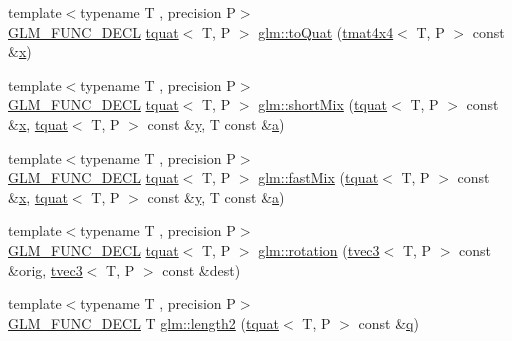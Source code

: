 \begin{DoxyCompactItemize}
\item 
{\footnotesize template$<$typename T , precision P$>$ }\\\mbox{\hyperlink{setup_8hpp_ab2d052de21a70539923e9bcbf6e83a51}{G\+L\+M\+\_\+\+F\+U\+N\+C\+\_\+\+D\+E\+CL}} \mbox{\hyperlink{structglm_1_1tquat}{tquat}}$<$ T, P $>$ \mbox{\hyperlink{group__gtx__quaternion_ga808dd0f83ee8150db7e652313bde8eb2}{glm\+::to\+Quat}} (\mbox{\hyperlink{structglm_1_1tmat4x4}{tmat4x4}}$<$ T, P $>$ const \&\mbox{\hyperlink{glad_8h_a92d0386e5c19fb81ea88c9f99644ab1d}{x}})
\item 
{\footnotesize template$<$typename T , precision P$>$ }\\\mbox{\hyperlink{setup_8hpp_ab2d052de21a70539923e9bcbf6e83a51}{G\+L\+M\+\_\+\+F\+U\+N\+C\+\_\+\+D\+E\+CL}} \mbox{\hyperlink{structglm_1_1tquat}{tquat}}$<$ T, P $>$ \mbox{\hyperlink{group__gtx__quaternion_ga3534443de2a1a806f386976546cddc81}{glm\+::short\+Mix}} (\mbox{\hyperlink{structglm_1_1tquat}{tquat}}$<$ T, P $>$ const \&\mbox{\hyperlink{glad_8h_a92d0386e5c19fb81ea88c9f99644ab1d}{x}}, \mbox{\hyperlink{structglm_1_1tquat}{tquat}}$<$ T, P $>$ const \&\mbox{\hyperlink{glad_8h_a66ddd433d2cacfe27f5906b7e86faeed}{y}}, T const \&\mbox{\hyperlink{glad_8h_ac8729153468b5dcf13f971b21d84d4e5}{a}})
\item 
{\footnotesize template$<$typename T , precision P$>$ }\\\mbox{\hyperlink{setup_8hpp_ab2d052de21a70539923e9bcbf6e83a51}{G\+L\+M\+\_\+\+F\+U\+N\+C\+\_\+\+D\+E\+CL}} \mbox{\hyperlink{structglm_1_1tquat}{tquat}}$<$ T, P $>$ \mbox{\hyperlink{group__gtx__quaternion_gac11bf550f17d1da14423595a27575084}{glm\+::fast\+Mix}} (\mbox{\hyperlink{structglm_1_1tquat}{tquat}}$<$ T, P $>$ const \&\mbox{\hyperlink{glad_8h_a92d0386e5c19fb81ea88c9f99644ab1d}{x}}, \mbox{\hyperlink{structglm_1_1tquat}{tquat}}$<$ T, P $>$ const \&\mbox{\hyperlink{glad_8h_a66ddd433d2cacfe27f5906b7e86faeed}{y}}, T const \&\mbox{\hyperlink{glad_8h_ac8729153468b5dcf13f971b21d84d4e5}{a}})
\item 
{\footnotesize template$<$typename T , precision P$>$ }\\\mbox{\hyperlink{setup_8hpp_ab2d052de21a70539923e9bcbf6e83a51}{G\+L\+M\+\_\+\+F\+U\+N\+C\+\_\+\+D\+E\+CL}} \mbox{\hyperlink{structglm_1_1tquat}{tquat}}$<$ T, P $>$ \mbox{\hyperlink{group__gtx__quaternion_gac4856d356c5c97cec74e9b672ea89240}{glm\+::rotation}} (\mbox{\hyperlink{structglm_1_1tvec3}{tvec3}}$<$ T, P $>$ const \&orig, \mbox{\hyperlink{structglm_1_1tvec3}{tvec3}}$<$ T, P $>$ const \&dest)
\item 
{\footnotesize template$<$typename T , precision P$>$ }\\\mbox{\hyperlink{setup_8hpp_ab2d052de21a70539923e9bcbf6e83a51}{G\+L\+M\+\_\+\+F\+U\+N\+C\+\_\+\+D\+E\+CL}} T \mbox{\hyperlink{group__gtx__quaternion_ga02b45352c7ac345cabc9e877314acda6}{glm\+::length2}} (\mbox{\hyperlink{structglm_1_1tquat}{tquat}}$<$ T, P $>$ const \&\mbox{\hyperlink{glad_8h_a514729309336df22bcc8eda979d6ced4}{q}})
\end{DoxyCompactItemize}


